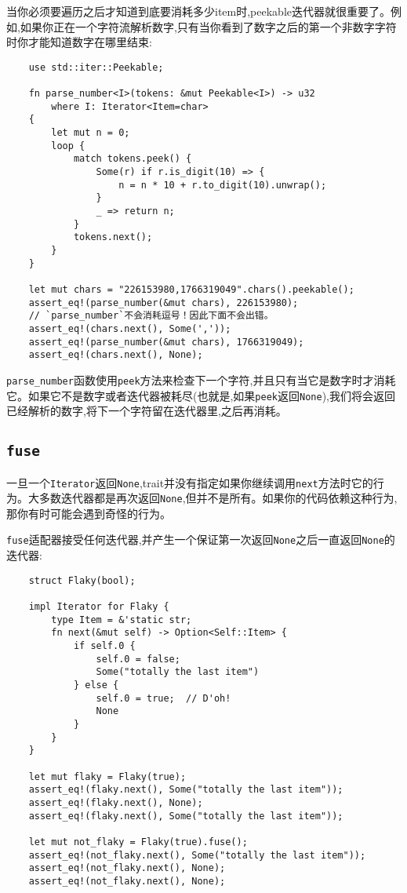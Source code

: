 当你必须要遍历之后才知道到底要消耗多少item时,peekable迭代器就很重要了。例如,如果你正在一个字符流解析数字,只有当你看到了数字之后的第一个非数字字符时你才能知道数字在哪里结束:
\begin{verbatim}
    use std::iter::Peekable;

    fn parse_number<I>(tokens: &mut Peekable<I>) -> u32
        where I: Iterator<Item=char>
    {
        let mut n = 0;
        loop {
            match tokens.peek() {
                Some(r) if r.is_digit(10) => {
                    n = n * 10 + r.to_digit(10).unwrap();
                }
                _ => return n;
            }
            tokens.next();
        }
    }

    let mut chars = "226153980,1766319049".chars().peekable();
    assert_eq!(parse_number(&mut chars), 226153980);
    // `parse_number`不会消耗逗号！因此下面不会出错。
    assert_eq!(chars.next(), Some(','));
    assert_eq!(parse_number(&mut chars), 1766319049);
    assert_eq!(chars.next(), None);
\end{verbatim}


\texttt{parse\_number}函数使用\texttt{peek}方法来检查下一个字符,并且只有当它是数字时才消耗它。如果它不是数字或者迭代器被耗尽(也就是,如果\texttt{peek}返回\texttt{None}),我们将会返回已经解析的数字,将下一个字符留在迭代器里,之后再消耗。

\subsection{\texttt{fuse}}\label{fuse}
一旦一个\texttt{Iterator}返回\texttt{None},trait并没有指定如果你继续调用\texttt{next}方法时它的行为。大多数迭代器都是再次返回\texttt{None},但并不是所有。如果你的代码依赖这种行为,那你有时可能会遇到奇怪的行为。

\texttt{fuse}适配器接受任何迭代器,并产生一个保证第一次返回\texttt{None}之后一直返回\texttt{None}的迭代器:
\begin{verbatim}
    struct Flaky(bool);

    impl Iterator for Flaky {
        type Item = &'static str;
        fn next(&mut self) -> Option<Self::Item> {
            if self.0 {
                self.0 = false;
                Some("totally the last item")
            } else {
                self.0 = true;  // D'oh!
                None
            }
        }
    }

    let mut flaky = Flaky(true);
    assert_eq!(flaky.next(), Some("totally the last item"));
    assert_eq!(flaky.next(), None);
    assert_eq!(flaky.next(), Some("totally the last item"));

    let mut not_flaky = Flaky(true).fuse();
    assert_eq!(not_flaky.next(), Some("totally the last item"));
    assert_eq!(not_flaky.next(), None);
    assert_eq!(not_flaky.next(), None);
\end{verbatim}

